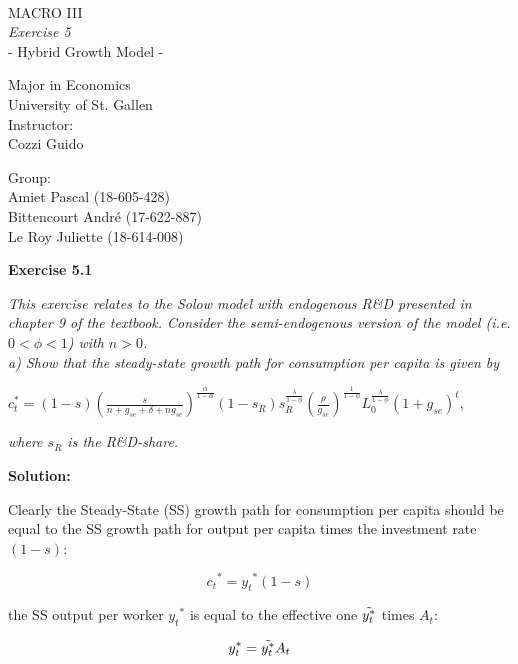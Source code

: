 \documentclass[11pt]{article} %
\begin{document}
\thispagestyle{empty}
\ \vspace{1.0cm}
\begin{center}
{\LARGE
MACRO III \\
\textit{Exercise 5} \\
{\small - Hybrid Growth Model -}\\[2cm]
}

{
Major in Economics \\
{University of St. Gallen} \\ [2cm]
Instructor:\\
Cozzi Guido \\[2cm]
}

{
Group:\\
Amiet Pascal (18-605-428)\\
Bittencourt André (17-622-887)\\
Le Roy Juliette (18-614-008)\\
}
\end{center}

\pagebreak

\textbf{\Large{Exercise 5.1}}

\textit{This exercise relates to the Solow model with endogenous R\&D presented in chapter 9 of the textbook. Consider the semi-endogenous version of the model (i.e. $0 < \phi < 1$) with $n > 0$.}\\

\textit{a) Show that the steady-state growth path for consumption per capita is given by}
\begin{center}
    $c_t^* = (1-s)\left(\frac{s}{n+g_{se}+\delta+ng_{se}}\right)^{\frac{\alpha}{1-\alpha}}(1-s_{R})s_R^{\frac{\lambda}{1-\phi}}\left(\frac{\rho}{g_{se}} \right)^{\frac{1}{1-\phi}}L_0^{\frac{\lambda}{1-\phi}}(1+g_{se})^t$,
\end{center}
\textit{where $s_R$ is the R\&D-share.}

\bigskip\bigskip\bigskip \textbf{Solution:}
\par Clearly the Steady-State (SS) growth path for consumption per capita should be equal to the SS growth path for output per capita times the investment rate $(1-s)$:

\begin{equation}
    {c_t}^*={y_t}^{*}(1-s)
\end{equation}

\par the SS output per worker ${y_t}^*$ is equal to the effective one $\Tilde{y_t^*}$ times $A_t$:

\begin{equation}
    y_t^*=\Tilde{y_t^*}A_t
\end{equation}
\end{document}
